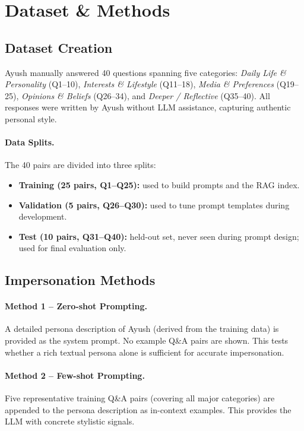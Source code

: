 \documentclass[11pt]{article}
\begin{document}
\section{Dataset \& Methods}

\subsection{Dataset Creation}
Ayush manually answered 40 questions spanning five categories:
\textit{Daily Life \& Personality} (Q1--10),
\textit{Interests \& Lifestyle} (Q11--18),
\textit{Media \& Preferences} (Q19--25),
\textit{Opinions \& Beliefs} (Q26--34), and
\textit{Deeper / Reflective} (Q35--40).
All responses were written by Ayush without LLM assistance, capturing
authentic personal style.

\paragraph{Data Splits.}
The 40 pairs are divided into three splits:
\begin{itemize}
  \item \textbf{Training (25 pairs, Q1--Q25):} used to build prompts and
        the RAG index.
  \item \textbf{Validation (5 pairs, Q26--Q30):} used to tune prompt
        templates during development.
  \item \textbf{Test (10 pairs, Q31--Q40):} held-out set, never seen
        during prompt design; used for final evaluation only.
\end{itemize}

\subsection{Impersonation Methods}

\paragraph{Method 1 – Zero-shot Prompting.}
A detailed persona description of Ayush (derived from the training data)
is provided as the system prompt.
No example Q\&A pairs are shown.
This tests whether a rich textual persona alone is sufficient for
accurate impersonation.

\paragraph{Method 2 – Few-shot Prompting.}
Five representative training Q\&A pairs (covering all major categories)
are appended to the persona description as in-context examples.
This provides the LLM with concrete stylistic signals.
\end{document}
